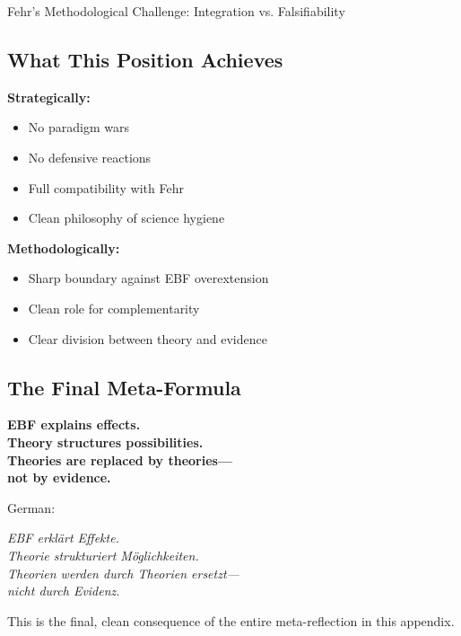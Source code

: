 \begin{chapter}{Fehr's Methodological Challenge: Integration vs. Falsifiability}
\subsection{What This Position Achieves}

\textbf{Strategically:}
\begin{itemize}[noitemsep]
    \item No paradigm wars
    \item No defensive reactions
    \item Full compatibility with Fehr
    \item Clean philosophy of science hygiene
\end{itemize}

\textbf{Methodologically:}
\begin{itemize}[noitemsep]
    \item Sharp boundary against EBF overextension
    \item Clean role for complementarity
    \item Clear division between theory and evidence
\end{itemize}

\subsection{The Final Meta-Formula}

\begin{tcolorbox}[colback=red!10!white,colframe=red!75!black,title=\textbf{The Concluding Position (Memorize)}]
\begin{center}
\Large
\textbf{EBF explains effects.}\\[0.3em]
\textbf{Theory structures possibilities.}\\[0.3em]
\textbf{Theories are replaced by theories---}\\
\textbf{not by evidence.}
\end{center}

\vspace{0.5em}
\normalsize
German:

\begin{center}
\textit{EBF erklärt Effekte.\\
Theorie strukturiert Möglichkeiten.\\
Theorien werden durch Theorien ersetzt---\\
nicht durch Evidenz.}
\end{center}
\end{tcolorbox}

This is the final, clean consequence of the entire meta-reflection in this appendix.



\end{chapter}
